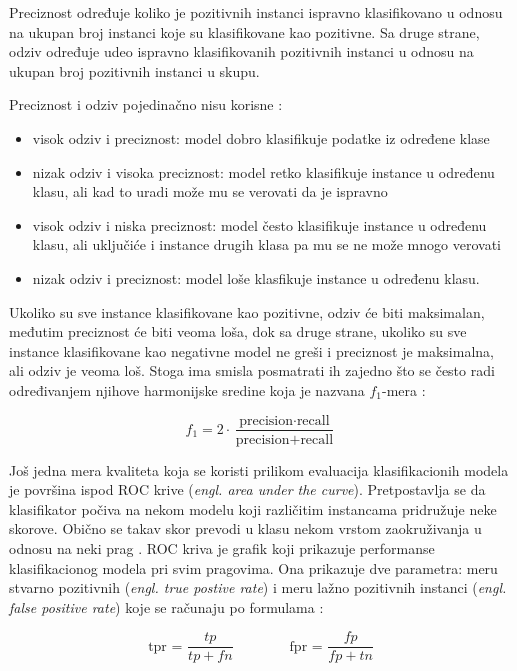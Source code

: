 \noindent Preciznost određuje koliko je pozitivnih instanci ispravno klasifikovano u odnosu na ukupan broj instanci koje su klasifikovane kao pozitivne. Sa druge strane, odziv određuje udeo ispravno klasifikovanih pozitivnih instanci u odnosu na ukupan broj pozitivnih instanci u skupu. 

Preciznost i odziv pojedinačno nisu korisne \cite{handleImblMLOnl}:

\begin{itemize}
	\item visok odziv i preciznost: model dobro klasifikuje podatke iz određene klase
	\item nizak odziv i visoka preciznost: model retko klasifikuje instance u  određenu klasu, ali kad to uradi može mu se verovati da je ispravno
	\item visok odziv i niska preciznost: model često klasifikuje instance u određenu klasu, ali uključiće i instance drugih klasa pa mu se ne može mnogo verovati
	\item nizak odziv i preciznost: model loše klasfikuje instance u određenu klasu.
\end{itemize}

Ukoliko su sve instance klasifikovane kao pozitivne, odziv će biti maksimalan, međutim preciznost će biti veoma loša, dok sa druge strane, ukoliko su sve instance klasifikovane kao negativne model ne greši i preciznost je maksimalna, ali odziv je veoma loš. Stoga ima smisla posmatrati ih zajedno što se često radi određivanjem njihove harmonijske sredine koja je nazvana $f_1$-mera \cite{ml}:

$$f_1 = 2 \cdot \dfrac{\text{precision} \cdot \text{recall}}{\text{precision} + \text{recall}}$$

Još jedna mera kvaliteta koja se koristi prilikom evaluacija klasifikacionih modela je površina ispod ROC krive (\textit{engl. area under the curve}). Pretpostavlja se da klasifikator počiva na nekom modelu koji različitim instancama pridružuje neke skorove. Obično se takav skor prevodi u klasu nekom vrstom zaokruživanja u odnosu na neki prag \cite{ml}. ROC kriva je grafik koji prikazuje performanse klasifikacionog modela pri svim pragovima. Ona prikazuje dve parametra: meru stvarno pozitivnih (\textit{engl. true postive rate}) i meru lažno pozitivnih instanci (\textit{engl. false positive rate}) koje se računaju po formulama \cite{roc}:

$$ \text{tpr = } \dfrac{tp}{tp + fn}  \qquad  \qquad \text{fpr = } \dfrac{fp}{fp + tn}$$

